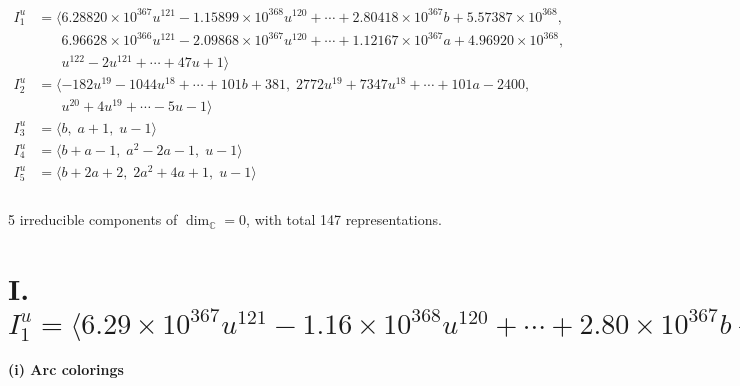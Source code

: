 \documentclass[1p]{elsarticle_modified}
\theoremstyle{definition}
\begin{document}
\begin{align*}
I^u_{1}&=\langle 
6.28820\times10^{367} u^{121}-1.15899\times10^{368} u^{120}+\cdots+2.80418\times10^{367} b+5.57387\times10^{368},\\
\phantom{I^u_{1}}&\phantom{= \langle  }6.96628\times10^{366} u^{121}-2.09868\times10^{367} u^{120}+\cdots+1.12167\times10^{367} a+4.96920\times10^{368},\\
\phantom{I^u_{1}}&\phantom{= \langle  }u^{122}-2 u^{121}+\cdots+47 u+1\rangle \\
I^u_{2}&=\langle 
-182 u^{19}-1044 u^{18}+\cdots+101 b+381,\;2772 u^{19}+7347 u^{18}+\cdots+101 a-2400,\\
\phantom{I^u_{2}}&\phantom{= \langle  }u^{20}+4 u^{19}+\cdots-5 u-1\rangle \\
I^u_{3}&=\langle 
b,\;a+1,\;u-1\rangle \\
I^u_{4}&=\langle 
b+a-1,\;a^2-2 a-1,\;u-1\rangle \\
I^u_{5}&=\langle 
b+2 a+2,\;2 a^2+4 a+1,\;u-1\rangle \\
\\
\end{align*}
\raggedright * 5 irreducible components of $\dim_{\mathbb{C}}=0$, with total 147 representations.\\
\newpage
\renewcommand{\arraystretch}{1}
\centering \section*{I. $I^u_{1}= \langle 6.29\times10^{367} u^{121}-1.16\times10^{368} u^{120}+\cdots+2.80\times10^{367} b+5.57\times10^{368},\;6.97\times10^{366} u^{121}-2.10\times10^{367} u^{120}+\cdots+1.12\times10^{367} a+4.97\times10^{368},\;u^{122}-2 u^{121}+\cdots+47 u+1 \rangle$}
\flushleft \textbf{(i) Arc colorings}\\
\end{document}
